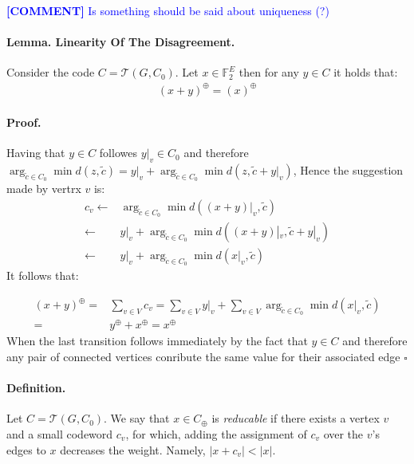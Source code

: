 \documentclass{article}
\newcommand{\commentt}[1]{\textcolor{blue}{ \textbf{[COMMENT]} #1}}
\newcommand{\ctt}[1]{\commentt{#1}}
\newcommand{ \Tann } {  \mathcal{T}\left( G, C_0 \right) }
\begin{document}
\begin{multicols*}{2}
  \ctt{ Is something should be said about uniqueness (?) } 

  \paragraph{Lemma. Linearity Of The Disagreement.} Consider the code $C = \Tann$. Let $ x \in \mathbb{F}_{2}^{E}$ then for any $ y \in C$ it holds that: 
  \begin{equation*}
    \begin{split}
      \left( x + y  \right)^{\oplus} = \left( x  \right)^{\oplus} 
    \end{split}
  \end{equation*}
  \paragraph{Proof.} Having that $y \in C$ followes $y|_v \in C_{0}$ and therefore $\arg_{ \tilde{c} \in C_{0}} \min{ d( z  , \tilde{c} ) } = y|_{v} + \arg_{ \tilde{c} \in C_{0}} \min{ d( z, \tilde{c} + y|_{v} ) } $, Hence the suggestion made by vertrx $v$ is: 
  \begin{equation*}
    \begin{split}
      c_{v}\leftarrow &  \arg_{ \tilde{c} \in C_{0}} \min{ d( (x+y)|_{v}  , \tilde{c} ) } \\
      \leftarrow &  y|_{v} +  \arg_{ \tilde{c} \in C_{0}} \min{ d( (x+y)|_{v}  , \tilde{c} + y|_{v} ) } \\
      \leftarrow &  y|_{v} +  \arg_{ \tilde{c} \in C_{0}} \min{ d( x|_{v} , \tilde{c} ) } 
    \end{split}
  \end{equation*}
  It follows that: 

  \begin{equation*}
    \begin{split}
      \left( x + y \right)^{\oplus} =& \sum_{v\in V}{c_{v}} = \sum_{v \in V}{y|_{v}} + \sum_{v\in V}{ \arg_{ \tilde{c} \in C_{0}} \min{ d( x|_{v} , \tilde{c} ) } } \\ 
      =& y^{\oplus} + x^{\oplus} = x^{\oplus}
    \end{split}
  \end{equation*}
  When the last transition follows immediately by the fact that $y \in C$ and therefore any pair of connected vertices conribute the same value for their associated edge $\square$

  \paragraph{Definition.} Let $C = \Tann$. We say that $x \in C_{\oplus}$ is \textit{reducable} if there exists a vertex $v$ and a small codeword $c_v$, for which, adding the assignment of $c_v$ over the $v$'s edges to $x$ decreases the weight. Namely, $|x + c_{v}| < |x|$. 


\end{multicols*}
\end{document}
